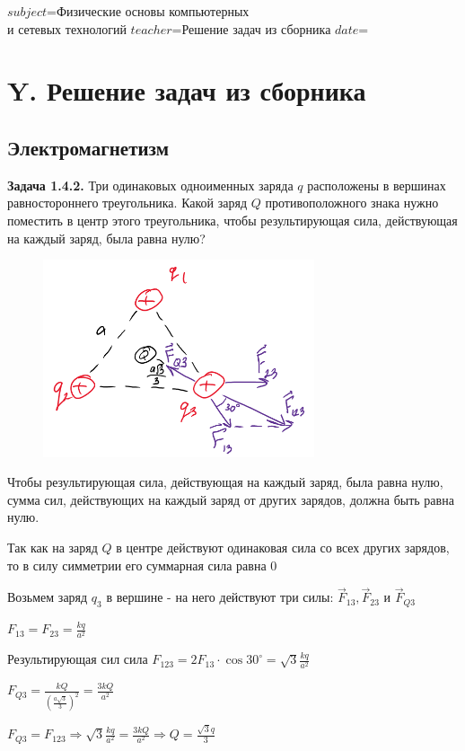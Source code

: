 $subject$=Физические основы компьютерных \\ и сетевых технологий
$teacher$=Решение задач из сборника
$date$=

\clearpage

\section{Y. Решение задач из сборника}

\subsection{Электромагнетизм}

\begin{tcolorbox}
    \textbf{Задача 1.4.2.} Три одинаковых одноименных заряда $q$
    расположены в вершинах равностороннего треугольника. Какой
    заряд $Q$ противоположного знака нужно поместить в центр этого
    треугольника, чтобы результирующая сила, действующая на
    каждый заряд, была равна нулю?
\end{tcolorbox}

\begin{minipage}{\textwidth}
    \begin{figure}
        \includegraphics[width=8cm]{physics1/images/physics1_homework_6_1}
    \end{figure}

    Чтобы результирующая сила, действующая на каждый заряд, была равна нулю, сумма сил, 
    действующих на каждый заряд от других зарядов, должна быть равна нулю.

    Так как на заряд $Q$ в центре действуют одинаковая сила со всех других зарядов, то в силу симметрии его суммарная сила равна 0 

    Возьмем заряд $q_3$ в вершине - на него действуют три силы: $\vec{F}_{13}, \vec{F}_{23}$ и $\vec{F}_{Q3}$

    $F_{13} = F_{23} = \frac{kq}{a^2}$

    Результирующая сил сила $F_{123} = 2F_{13} \cdot \cos 30^\circ = \sqrt{3}\frac{kq}{a^2}$

    $F_{Q3} = \frac{kQ}{\left(\frac{a\sqrt{3}}{3}\right)^2} = \frac{3kQ}{a^2}$

    $F_{Q3} = F_{123} \Longrightarrow \sqrt{3}\frac{kq}{a^2} = \frac{3kQ}{a^2} \Longrightarrow Q = \frac{\sqrt{3}q}{3}$
\end{minipage}

